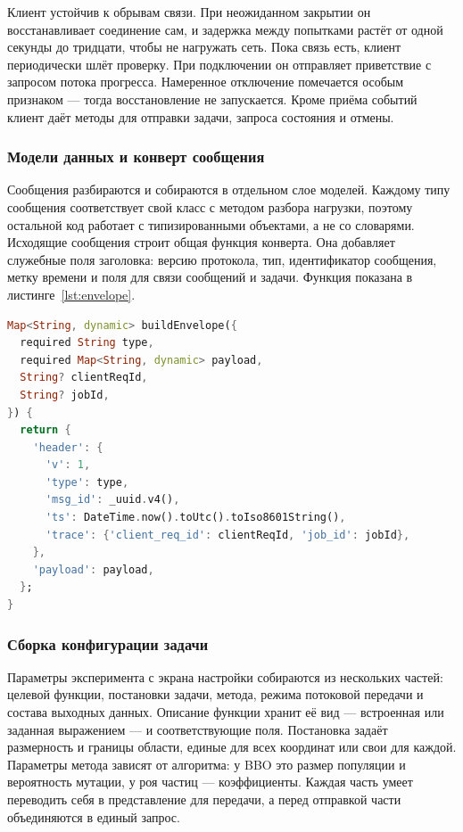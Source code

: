 \documentclass[14pt, a4paper]{extarticle}
\begin{document}
Клиент устойчив к обрывам связи. При неожиданном закрытии он восстанавливает
соединение сам, и задержка между попытками растёт от одной секунды до тридцати,
чтобы не нагружать сеть. Пока связь есть, клиент периодически шлёт проверку. При
подключении он отправляет приветствие с запросом потока прогресса. Намеренное
отключение помечается особым признаком --- тогда восстановление не запускается.
Кроме приёма событий клиент даёт методы для отправки задачи, запроса состояния и
отмены.

\subsubsection{Модели данных и конверт сообщения}
Сообщения разбираются и собираются
в отдельном слое моделей. Каждому типу сообщения соответствует свой класс с методом
разбора нагрузки, поэтому остальной код работает с типизированными объектами, а не
со словарями. Исходящие сообщения строит общая функция конверта. Она добавляет
служебные поля заголовка: версию протокола, тип, идентификатор сообщения, метку
времени и поля для связи сообщений и задачи. Функция показана в
листинге~\ref{lst:envelope}.

\begin{lstlisting}[language=Dart, caption={Построение конверта исходящего сообщения}, label={lst:envelope}]
Map<String, dynamic> buildEnvelope({
  required String type,
  required Map<String, dynamic> payload,
  String? clientReqId,
  String? jobId,
}) {
  return {
    'header': {
      'v': 1,
      'type': type,
      'msg_id': _uuid.v4(),
      'ts': DateTime.now().toUtc().toIso8601String(),
      'trace': {'client_req_id': clientReqId, 'job_id': jobId},
    },
    'payload': payload,
  };
}
\end{lstlisting}

\subsubsection{Сборка конфигурации задачи}
Параметры эксперимента с экрана настройки
собираются из нескольких частей: целевой функции, постановки задачи, метода, режима
потоковой передачи и состава выходных данных. Описание функции хранит её вид ---
встроенная или заданная выражением --- и соответствующие поля. Постановка задаёт
размерность и границы области, единые для всех координат или свои для каждой.
Параметры метода зависят от алгоритма: у BBO это размер популяции и вероятность
мутации, у роя частиц --- коэффициенты. Каждая часть умеет переводить себя в
представление для передачи, а перед отправкой части объединяются в единый запрос.
\end{document}
